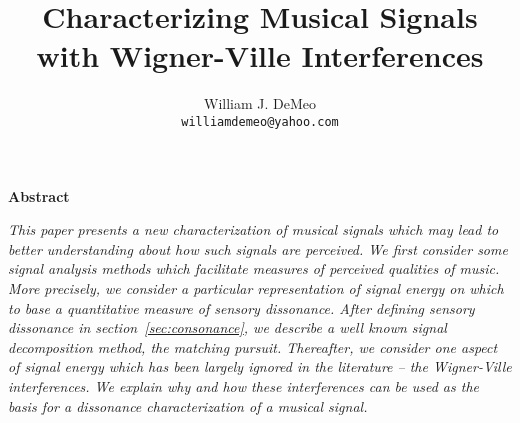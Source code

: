 \documentclass[10pt,a4paper]{article}
\begin{document}
\twocolumn

\title{\textbf{Characterizing Musical Signals \\
with Wigner-Ville Interferences}}
\author{William J. DeMeo\\
{\small {\tt williamdemeo@yahoo.com}}}
\date{}     %
\maketitle

\pagestyle{empty}          %
\thispagestyle{empty}      %


\begin{center}
\large{\textbf{Abstract}}
\end{center}
\hspace*{-0.1in}                       %
\noindent
\textit{
This paper presents a new characterization of musical signals which
may lead to better understanding about how such signals are perceived. 
We first consider some signal analysis methods which
facilitate measures of perceived qualities of music.  More precisely, we
consider a particular representation of signal energy on which to base a
quantitative measure of \emph{sensory dissonance}.  After defining sensory
dissonance in section~\ref{sec:consonance}, we describe a well known signal
decomposition method, the matching pursuit.  Thereafter, we consider one aspect of
signal energy which has been largely ignored in the literature -- the
Wigner-Ville interferences.  We explain why and how these interferences can be used
as the basis for a dissonance characterization of a musical signal.}







\small{

}
\end{document}
